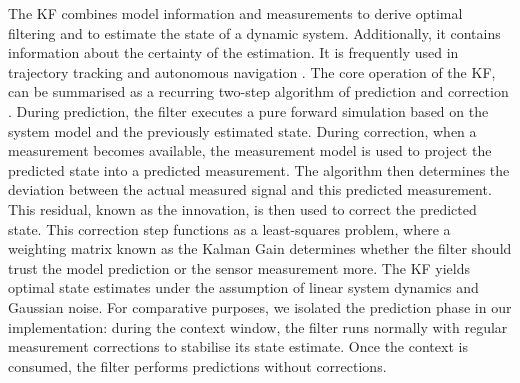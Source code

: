The \acf{KF} %
combines model information and measurements to derive optimal filtering %
and to estimate the state of a dynamic system. 
Additionally, it contains information about the certainty of the estimation. 
It is %
frequently used in trajectory tracking and autonomous navigation \parencite{kfapplications}. The core operation of the \ac{KF}, %
can be summarised as a recurring two-step algorithm of prediction and correction \parencite{Kalman1960}. 
During prediction, the filter executes a pure forward simulation based on the system model and the previously estimated state. 
During correction, when a measurement becomes available, the measurement model is used to project the predicted state into a predicted measurement. 
The algorithm then determines the deviation between the actual measured signal and this predicted measurement.
This residual, known as the innovation, is then used to correct the predicted state.
This correction step functions as a least-squares problem, where a weighting matrix known as the Kalman Gain determines whether the filter should trust the model prediction or the sensor measurement more.
The \ac{KF} yields optimal state estimates under the assumption of linear system dynamics and Gaussian noise.
For comparative purposes, we isolated the prediction phase in our implementation: during the context window, the filter runs normally with regular measurement corrections to stabilise its state estimate. Once the context is consumed, the filter performs predictions without corrections.

    
